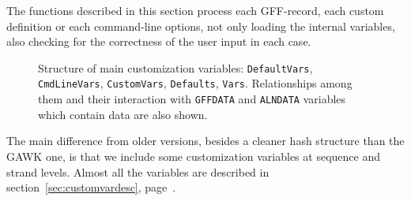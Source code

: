 \documentclass[11pt]{article}
\let\nwdocspar=\par                    %
\begin{document}

The functions described in this section process each GFF-record, each custom definition or each command-line options, not only loading the internal variables, also checking for the correctness of the user input in each case.

\label{todo:BBB}
\nwenddocs{}%
%
\nwdocspar
\nwenddocs{}%
%
\nwdocspar
\todo{ \item \todoBBB } %
\begin{figure}[!ht]
\begin{center}
\fbox{\parbox[c][8cm][c]{\linewidth}{\hfill}}
\caption[Structure of main customization variables]{\label{fig:customvarstruc} Structure of main customization variables: {\tt{}{}DefaultVars}, {\tt{}{}CmdLineVars}, {\tt{}{}CustomVars}, {\tt{}{}Defaults}, {\tt{}{}Vars}. Relationships among them and their interaction with {\tt{}{}GFF{}DATA} and {\tt{}{}ALN{}DATA} variables which contain data are also shown.}
\end{center}
\end{figure}


The main difference from older versions, besides a cleaner hash structure than the GAWK one, is that we include some customization variables at sequence and strand levels. Almost all the variables are described in section~\ref{sec:customvardesc}, page~\pageref{sec:customvardesc}.
\end{document}
